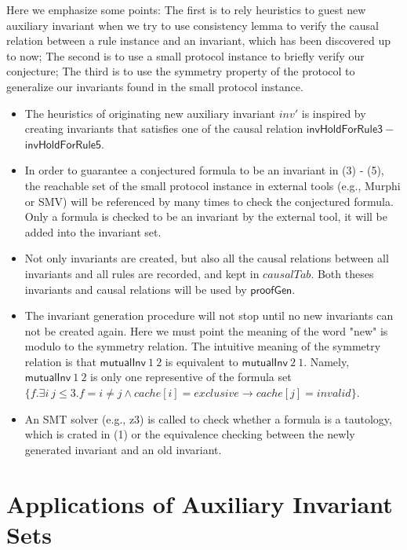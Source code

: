\documentclass{llncs}
\begin{document}
Here we emphasize some points:
The first is to rely
heuristics to guest new auxiliary invariant when we try to use
consistency lemma to verify the causal relation between a rule
instance and an invariant, which has been discovered up to now; The
second is to use a small protocol instance to briefly verify our
conjecture; The third is to use the symmetry property of the
protocol to generalize our invariants found in the small protocol
instance.
\begin{itemize}
\item The heuristics of originating new auxiliary invariant $inv'$ is inspired by creating invariants that satisfies one of the causal relation
  $\mathsf{invHoldForRule3}-$ $\mathsf{invHoldForRule5}$.


\item In order to guarantee a conjectured formula to be an invariant in (3) - (5), the reachable
 set of the  small protocol instance in external tools (e.g., Murphi or SMV) will be referenced by many times to check the conjectured  formula. Only a formula is checked to be an invariant by the external tool, it will be added into the invariant set.

\item Not only invariants are created, but also all the causal relations
between all invariants   and all rules are recorded, and kept in
$causalTab$. Both theses invariants and causal relations will be
used by $\mathsf{proofGen}$.

\item The invariant generation procedure will not stop until no new invariants can not be created again. Here we must point the meaning of the word "new" is modulo to the symmetry relation. The intuitive meaning of the symmetry relation is that $\mathsf{mutualInv}~1~2$ is equivalent to $\mathsf{mutualInv}~2~1$. Namely, $\mathsf{mutualInv}~1~2$  is only one representive of the formula set $\{f. \exists i~j \le 3.f=i\neq j \wedge cache[i]=exclusive\longrightarrow cache[j]=invalid \}$.

\item An SMT solver (e.g., z3) is called to  check whether a formula is a tautology,  which is crated in (1) or the equivalence checking   between the newly generated invariant and  an old invariant.

\end{itemize}

\section{Applications of Auxiliary Invariant Sets}
\end{document}
